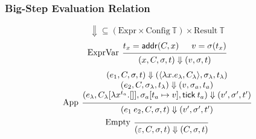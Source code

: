 \documentclass{beamer}
\newcommand*{\Expr}{\text{Expr}}
\newcommand*{\Time}{\mathbb{T}}
\newcommand*{\Config}[1]{\text{Config}\:{#1}}
\newcommand*{\Result}[1]{\text{Result}\:{#1}}
\newcommand*{\addr}{\mathsf{addr}}
\newcommand*{\tick}{\mathsf{tick}}
\begin{document}
\begin{frame}[c]
  \frametitle{Big-Step Evaluation Relation}
  \[\Downarrow\subseteq(\Expr\times\Config{\Time})\times\Result{\Time}\]
  \pause
  \[
    \begin{prooftree}
      \hypo{t_{x}=\addr(C,x)}
      \hypo{v=\sigma(t_{x})}
      \infer[left label=ExprVar]2{
      (x, C, \sigma, t)
      \Downarrow
      (v, \sigma, t)
      }
    \end{prooftree}
  \]
  \pause
  \[
    \begin{prooftree}
      \hypo{
        \begin{matrix}
          (e_{1}, C, \sigma, t)
          \Downarrow
          (\langle\lambda x.e_{\lambda}, C_{\lambda}\rangle, \sigma_{\lambda}, t_{\lambda}) \\
          (e_{2}, C, \sigma_{\lambda}, t_{\lambda})
          \Downarrow
          (v, \sigma_{a}, t_{a})                                                            \\
          (e_{\lambda}, C_{\lambda}[\lambda x^{t_{a}}.[]], \sigma_{a}[t_{a}\mapsto v], \tick\:t_{a})
          \Downarrow
          (v', \sigma',t')
        \end{matrix}
      }
      \infer[left label={App}]1{
      (e_{1}\:e_{2}, C, \sigma, t)
      \Downarrow
      (v', \sigma',t')
      }
    \end{prooftree}
  \]
  \pause
  \[
    \begin{prooftree}
      \infer[left label=Empty]0{
      (\varepsilon, C, \sigma, t)
      \Downarrow
      (C, \sigma, t)
      }
    \end{prooftree}
  \]
\end{frame}
\end{document}
